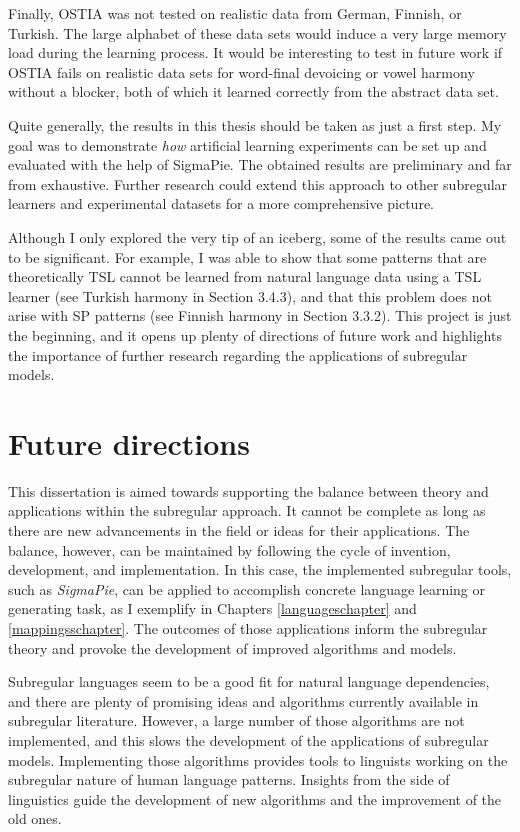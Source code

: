 Finally, OSTIA was not tested on realistic data from German, Finnish, or Turkish.
The large alphabet of these data sets would induce a very large memory load during the learning process.
It would be interesting to test in future work if OSTIA fails on realistic data sets for word-final devoicing or vowel harmony without a blocker, both of which it learned correctly from the abstract data set.

Quite generally, the results in this thesis should be taken as just a first step.
My goal was to demonstrate \emph{how} artificial learning experiments can be set up and evaluated with the help of SigmaPie.
The obtained results are preliminary and far from exhaustive.
Further research could extend this approach to other subregular learners and experimental datasets for a more comprehensive picture.

Although I only explored the very tip of an iceberg, some of the results came out to be significant.
For example, I was able to show that some patterns that are theoretically TSL cannot be learned from natural language data using a TSL learner (see Turkish harmony in Section 3.4.3), and that this problem does not arise with SP patterns (see Finnish harmony in Section 3.3.2).
This project is just the beginning, and it opens up plenty of directions of future work and highlights the importance of further research regarding the applications of subregular models.





\section{Future directions}

This dissertation is aimed towards supporting the balance between theory and applications within the subregular approach.
It cannot be complete as long as there are new advancements in the field or ideas for their applications.
The balance, however, can be maintained by following the cycle of invention, development, and implementation.
In this case, the implemented subregular tools, such as \emph{SigmaPie}, can be applied to accomplish concrete language learning or generating task, as I exemplify in Chapters \ref{languageschapter} and \ref{mappingsschapter}.
The outcomes of those applications inform the subregular theory and provoke the development of improved algorithms and models.

Subregular languages seem to be a good fit for natural language dependencies, and there are plenty of promising ideas and algorithms currently available in subregular literature.
However, a large number of those algorithms are not implemented, and this slows the development of the applications of subregular models.
Implementing those algorithms provides tools to linguists working on the subregular nature of human language patterns.
Insights from the side of linguistics guide the development of new algorithms and the improvement of the old ones.


